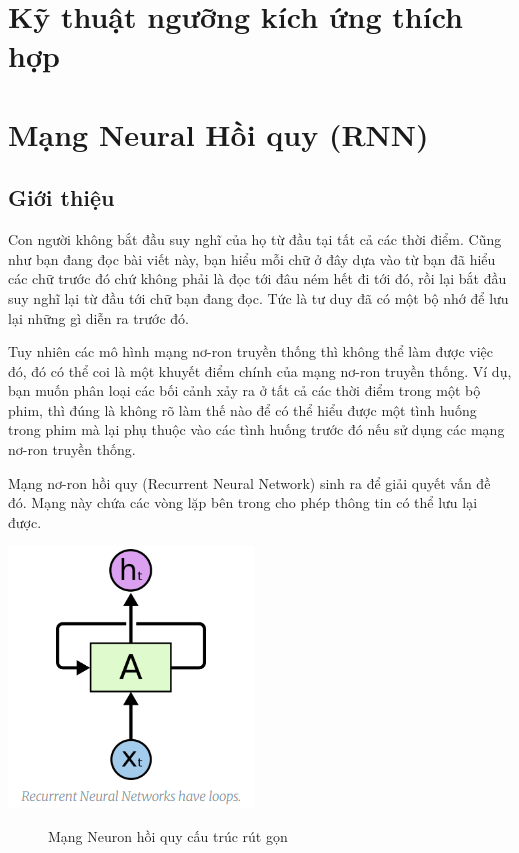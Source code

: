 \section{Kỹ thuật ngưỡng kích ứng thích hợp}

\section{Mạng Neural Hồi quy (RNN)}
\subsection{Giới thiệu}
Con người không bắt đầu suy nghĩ của họ từ đầu tại tất cả các thời điểm. Cũng như bạn đang đọc bài viết này, bạn hiểu mỗi chữ ở đây dựa vào từ bạn đã hiểu các chữ trước đó chứ không phải là đọc tới đâu ném hết đi tới đó, rồi lại bắt đầu suy nghĩ lại từ đầu tới chữ bạn đang đọc. Tức là tư duy đã có một bộ nhớ để lưu lại những gì diễn ra trước đó.\par
Tuy nhiên các mô hình mạng nơ-ron truyền thống thì không thể làm được việc đó, đó có thể coi là một khuyết điểm chính của mạng nơ-ron truyền thống. Ví dụ, bạn muốn phân loại các bối cảnh xảy ra ở tất cả các thời điểm trong một bộ phim, thì đúng là không rõ làm thế nào để có thể hiểu được một tình huống trong phim mà lại phụ thuộc vào các tình huống trước đó nếu sử dụng các mạng nơ-ron truyền thống.\par
Mạng nơ-ron hồi quy (Recurrent Neural Network) sinh ra để giải quyết vấn đề đó. Mạng này chứa các vòng lặp bên trong cho phép thông tin có thể lưu lại được. \cite{rnn-basic}
\begin{center}
    \includegraphics[scale=.5]{image/chapter6/RNN-node.png}
    \begin{figure}[htp]
    \begin{center}
    \end{center}
    \caption{Mạng Neuron hồi quy cấu trúc rút gọn}
    \end{figure}
\end{center}
